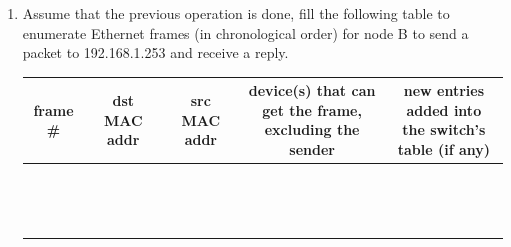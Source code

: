 \documentclass{report}
\begin{document}
\begin{problem}
\begin{enumerate}
\clearpage
  \item Assume that the previous operation is done,  fill the following table to enumerate Ethernet frames (in chronological order) for node B to send a packet to 192.168.1.253 and receive a reply.
  \begin{table}[H]
    \centering
    \begin{tabular*}{1.0\textwidth}{c | c | c | c | c}
      \hline
      frame \# &  dst MAC addr & src MAC addr & \pbox{20cm}{device(s) that can get the frame, \\excluding the sender} & \pbox{20cm}{new entries added into \\the switch's table (if any)} \\ \hline

        &  &  & &\\ 
        &  &  & &\\ 
        &  &  & &\\ 
        &  &  & &\\ 
        &  &  & &\\ 
        &  &  & &\\ 
        &  &  & &\\ 
        &  &  & &\\ 
        &  &  & &\\ 
        &  &  & &\\ 
        &  &  & &\\ 
        &  &  & &\\ 
        &  &  & &\\ 
        &  &  & &\\ 
    \end{tabular*}
  \end{table}
\end{enumerate}

\end{problem}
\end{document}
